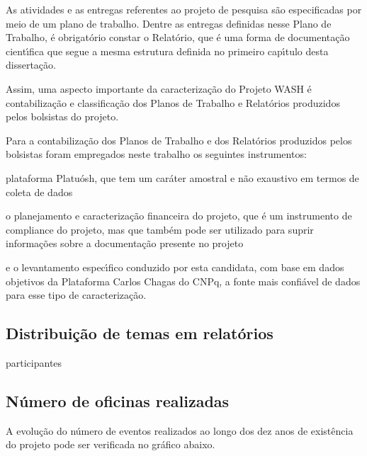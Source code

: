 \documentclass[
12pt,		%
openright,	%
twoside,  %
a4paper,			%
chapter=TITLE,		%
english,			%
french,				%
spanish,			%
brazil				%
]{USPSC-classe/USPSC_RedarTex}
\begin{document}
As atividades e as entregas referentes ao projeto de pesquisa s\~ao especificadas por meio de um plano de trabalho. Dentre as entregas definidas nesse Plano de Trabalho, \'e obrigat\'orio constar o Relat\'orio, que \'e uma forma de documenta\c{c}\~ao cient\'{\i}fica que segue a mesma estrutura definida no primeiro cap\'{\i}tulo desta disserta\c{c}\~ao.








Assim, uma aspecto importante da caracteriza\c{c}\~ao do Projeto WASH \'e contabiliza\c{c}\~ao e classifica\c{c}\~ao dos Planos de Trabalho e Relat\'orios produzidos pelos bolsistas do projeto.








Para a contabiliza\c{c}\~ao dos Planos de Trabalho e dos Relat\'orios produzidos pelos bolsistas foram empregados neste trabalho os seguintes instrumentos:









\begin{alineas}
\item plataforma Platu\'osh, que tem um car\'ater amostral e n\~ao exaustivo em termos de coleta de dados
\item o planejamento e caracteriza\c{c}\~ao financeira do projeto, que \'e um instrumento de compliance do projeto, mas que tamb\'em pode ser utilizado para suprir informa\c{c}\~oes sobre a documenta\c{c}\~ao presente no projeto
\item e o levantamento espec\'{\i}fico conduzido por esta candidata, com base em dados objetivos da Plataforma Carlos Chagas do CNPq, a fonte mais confi\'avel de dados para esse tipo de caracteriza\c{c}\~ao.
\end{alineas}

\subsection[Distribui\c{c}\~ao de temas em relat\'orios]{Distribui\c{c}\~ao de temas em relat\'orios}\label{Distribui\c{c}\~ao de temas em relat\'orios}
participantes








\subsection[N\'umero de oficinas realizadas]{N\'umero de oficinas realizadas}\label{N\'umero de oficinas realizadas}
A evolu\c{c}\~ao do n\'umero de eventos realizados ao longo dos dez anos de exist\^encia do projeto pode ser verificada no gr\'afico abaixo.
\end{document}
